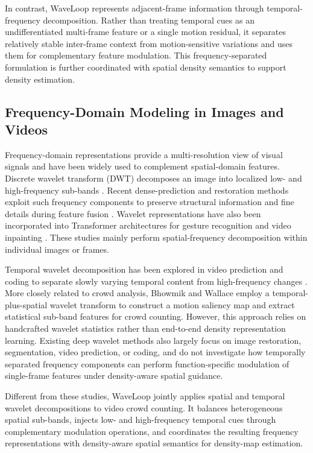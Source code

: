 \documentclass[lettersize,journal]{IEEEtran}
\begin{document}
In contrast, WaveLoop represents adjacent-frame information through temporal-frequency decomposition. Rather than treating temporal cues as an undifferentiated multi-frame feature or a single motion residual, it separates relatively stable inter-frame context from motion-sensitive variations and uses them for complementary feature modulation. This frequency-separated formulation is further coordinated with spatial density semantics to support density estimation.

\subsection{Frequency-Domain Modeling in Images and Videos}
Frequency-domain representations provide a multi-resolution view of visual signals and have been widely used to complement spatial-domain features. Discrete wavelet transform (DWT) decomposes an image into localized low- and high-frequency sub-bands \cite{mallat1989theory}. Recent dense-prediction and restoration methods exploit such frequency components to preserve structural information and fine details during feature fusion \cite{chen2024frequency,chen2024bracketing,yang2024sffnet}. Wavelet representations have also been incorporated into Transformer architectures for gesture recognition and video inpainting \cite{garg2024gestformer,zhang2024wtvi,wu2024waveformer}. These studies mainly perform spatial-frequency decomposition within individual images or frames.

Temporal wavelet decomposition has been explored in video prediction and coding to separate slowly varying temporal content from high-frequency changes \cite{jin2020exploring,lanz2019content,meyer2023learned}. More closely related to crowd analysis, Bhowmik and Wallace \cite{bhowmik2018statistical} employ a temporal-plus-spatial wavelet transform to construct a motion saliency map and extract statistical sub-band features for crowd counting. However, this approach relies on handcrafted wavelet statistics rather than end-to-end density representation learning. Existing deep wavelet methods also largely focus on image restoration, segmentation, video prediction, or coding, and do not investigate how temporally separated frequency components can perform function-specific modulation of single-frame features under density-aware spatial guidance.

Different from these studies, WaveLoop jointly applies spatial and temporal wavelet decompositions to video crowd counting. It balances heterogeneous spatial sub-bands, injects low- and high-frequency temporal cues through complementary modulation operations, and coordinates the resulting frequency representations with density-aware spatial semantics for density-map estimation.
\end{document}
